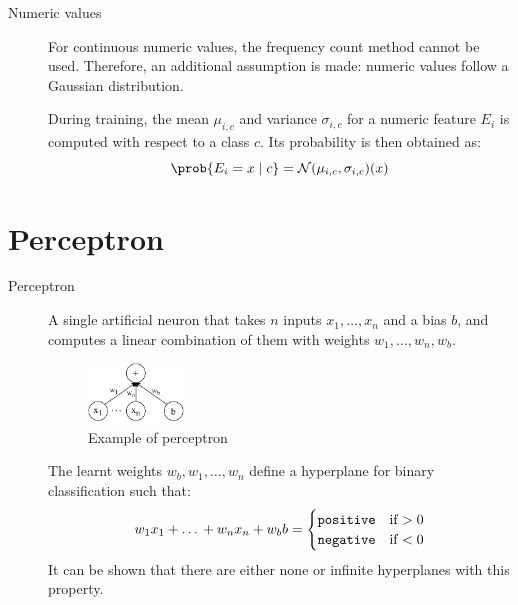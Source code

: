 \begin{description}
    \item[Numeric values] 
        For continuous numeric values, the frequency count method cannot be used.
        Therefore, an additional assumption is made: numeric values follow a Gaussian distribution.

        During training, the mean $\mu_{i,c}$ and variance $\sigma_{i,c}$ for a numeric feature $E_i$ is computed with respect to a class $c$.
        Its probability is then obtained as:
        \[ \prob{E_i = x \mid c} = \mathcal{N}(\mu_{i,c}, \sigma_{i,c})(x) \]

\end{description}



\section{Perceptron}

\begin{description}
    \item[Perceptron] 
        A single artificial neuron that takes $n$ inputs $x_1, \dots, x_n$ and a bias $b$,
        and computes a linear combination of them with weights $w_1, \dots, w_n, w_b$.
        \begin{figure}[h]
            \centering
            \includegraphics[width=0.25\textwidth]{img/_perceptron.pdf}
            \caption{Example of perceptron}
        \end{figure}

        The learnt weights $w_b, w_1, \dots, w_n$ define a hyperplane for binary classification such that:
        \[
            w_1 x_1 + \text{\dots} + w_n x_n + w_b b = \begin{cases}
                \texttt{positive} & \text{if $> 0$} \\
                \texttt{negative} & \text{if $< 0$} \\
            \end{cases}
        \]
        It can be shown that there are either none or infinite hyperplanes with this property.
\end{description}


